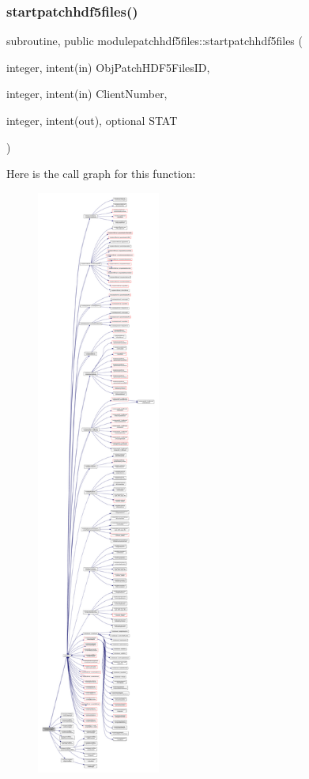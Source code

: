 \subsubsection{\texorpdfstring{startpatchhdf5files()}{startpatchhdf5files()}}
{\footnotesize\ttfamily subroutine, public modulepatchhdf5files\+::startpatchhdf5files (\begin{DoxyParamCaption}\item[{integer, intent(in)}]{Obj\+Patch\+H\+D\+F5\+Files\+ID,  }\item[{integer, intent(in)}]{Client\+Number,  }\item[{integer, intent(out), optional}]{S\+T\+AT }\end{DoxyParamCaption})}

Here is the call graph for this function\+:\nopagebreak
\begin{figure}[H]
\begin{center}
\leavevmode
\includegraphics[height=550pt]{namespacemodulepatchhdf5files_a3b72c3b4723946c225c3539103a6662e_cgraph}
\end{center}
\end{figure}
